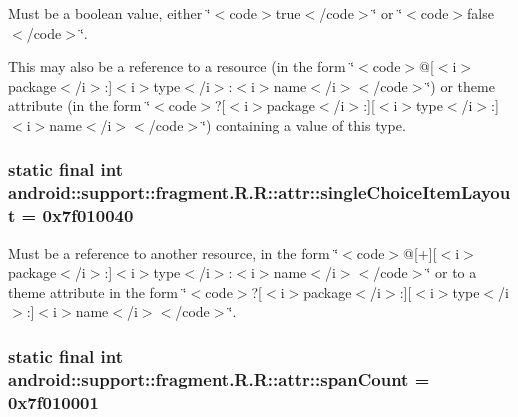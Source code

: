 Must be a boolean value, either \char`\"{}$<$code$>$true$<$/code$>$\char`\"{} or \char`\"{}$<$code$>$false$<$/code$>$\char`\"{}. 

This may also be a reference to a resource (in the form \char`\"{}$<$code$>$@\mbox{[}$<$i$>$package$<$/i$>$:\mbox{]}$<$i$>$type$<$/i$>$:$<$i$>$name$<$/i$>$$<$/code$>$\char`\"{}) or theme attribute (in the form \char`\"{}$<$code$>$?\mbox{[}$<$i$>$package$<$/i$>$:\mbox{]}\mbox{[}$<$i$>$type$<$/i$>$:\mbox{]}$<$i$>$name$<$/i$>$$<$/code$>$\char`\"{}) containing a value of this type. \hypertarget{classandroid_1_1support_1_1fragment_1_1_r_1_1attr_878e80df2d164640d6fc3de4afd50f28}{
\subsubsection[{singleChoiceItemLayout}]{\setlength{\rightskip}{0pt plus 5cm}static final int android::support::fragment.R.R::attr::singleChoiceItemLayout = 0x7f010040}}
\label{classandroid_1_1support_1_1fragment_1_1_r_1_1attr_878e80df2d164640d6fc3de4afd50f28}


Must be a reference to another resource, in the form \char`\"{}$<$code$>$@\mbox{[}+\mbox{]}\mbox{[}$<$i$>$package$<$/i$>$:\mbox{]}$<$i$>$type$<$/i$>$:$<$i$>$name$<$/i$>$$<$/code$>$\char`\"{} or to a theme attribute in the form \char`\"{}$<$code$>$?\mbox{[}$<$i$>$package$<$/i$>$:\mbox{]}\mbox{[}$<$i$>$type$<$/i$>$:\mbox{]}$<$i$>$name$<$/i$>$$<$/code$>$\char`\"{}. \hypertarget{classandroid_1_1support_1_1fragment_1_1_r_1_1attr_fbce6c247c2fc98a0f2db4eef55a8c3e}{
\subsubsection[{spanCount}]{\setlength{\rightskip}{0pt plus 5cm}static final int android::support::fragment.R.R::attr::spanCount = 0x7f010001}}
\label{classandroid_1_1support_1_1fragment_1_1_r_1_1attr_fbce6c247c2fc98a0f2db4eef55a8c3e}


